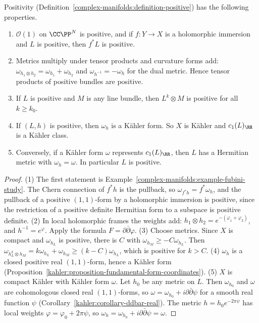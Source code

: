 \begin{proposition}\label{kodaira:proposition-positivity-properties}
Positivity (Definition~\ref{complex-manifolds:definition-positive}) has the following properties.
\begin{enumerate}
\item $\mathcal{O}(1)$ on $\CC\PP^N$ is positive, and if $f \colon Y \to X$ is a holomorphic immersion and $L$ is positive, then $f^*L$ is positive.
\item Metrics multiply under tensor products and curvature forms add: $\omega_{h_1 \otimes h_2} = \omega_{h_1} + \omega_{h_2}$ and
$\omega_{h^{-1}} = -\omega_h$ for the dual metric. Hence tensor products of positive bundles are positive.
\item If $L$ is positive and $M$ is any line bundle, then $L^k \otimes M$ is positive for all $k \geq k_0$.
\item If $(L, h)$ is positive, then $\omega_h$ is a K\"ahler form. So $X$ is K\"ahler and $c_1(L)_\RR$ is a K\"ahler class.
\item Conversely, if a K\"ahler form $\omega$ represents $c_1(L)_\RR$, then $L$ has a Hermitian metric with $\omega_h = \omega$. In
particular $L$ is positive.
\end{enumerate}
\end{proposition}

\begin{proof}
(1) The first statement is Example~\ref{complex-manifolds:example-fubini-study}. The Chern connection of $f^*h$ is the pullback, so
$\omega_{f^*h} = f^*\omega_h$, and the pullback of a positive $(1,1)$-form by a holomorphic immersion is positive, since the restriction of a
positive definite Hermitian form to a subspace is positive definite. (2) In local holomorphic frames the weights add:
$h_1 \otimes h_2 = e^{-(\varphi_1 + \varphi_2)}$, and $h^{-1} = e^{\varphi}$. Apply the formula $F = \partial\bar\partial\varphi$. (3) Choose
metrics. Since $X$ is compact and $\omega_{h_L}$ is positive, there is $C$ with $\omega_{h_M} \geq -C\omega_{h_L}$. Then
$\omega_{h_L^k \otimes h_M} = k\omega_{h_L} + \omega_{h_M} \geq (k - C)\omega_{h_L}$, which is positive for $k > C$. (4) $\omega_h$ is a closed
positive real $(1,1)$-form, hence a K\"ahler form (Proposition~\ref{kahler:proposition-fundamental-form-coordinates}). (5) $X$ is compact
K\"ahler with K\"ahler form $\omega$. Let $h_0$ be any metric on $L$. Then $\omega_{h_0}$ and $\omega$ are cohomologous closed real
$(1,1)$-forms, so $\omega = \omega_{h_0} + i\partial\bar\partial\psi$ for a smooth real function $\psi$
(Corollary~\ref{kahler:corollary-ddbar-real}). The metric $h = h_0e^{-2\pi\psi}$ has local weights $\varphi = \varphi_0 + 2\pi\psi$,
so $\omega_h = \omega_{h_0} + i\partial\bar\partial\psi = \omega$.
\end{proof}


